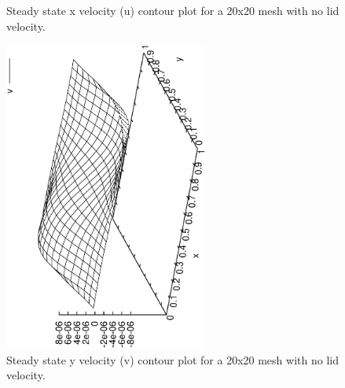 \documentclass[a4paper, 10pt]{article}
\begin{document}
\begin{enumerate}[I]
\begin{figure}
      \caption{Steady state x velocity (u) contour plot for a 20x20 mesh with no lid velocity.}
      \label{sol1u}
    \end{figure}
    \begin{figure}
      \centering
      \includegraphics[width=0.6\textwidth, angle = -90]{../plot/stability/solution/v.eps}
      \caption{Steady state y velocity (v) contour plot for a 20x20 mesh with no lid velocity.}
      \label{sol1v}
    \end{figure}


\end{enumerate}
\end{document}
